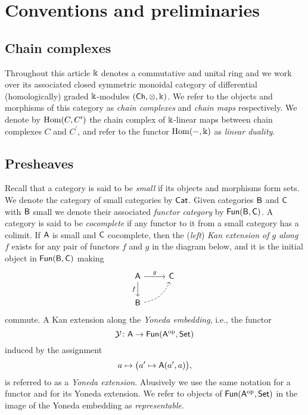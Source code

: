 \section{Conventions and preliminaries} \label{s:preliminaries}

\subsection{Chain complexes}

Throughout this article $\Bbbk$ denotes a commutative and unital ring and we work over its associated closed symmetric monoidal category of differential (homologically) graded $\Bbbk$-modules $(\mathsf{Ch}, \otimes, \Bbbk)$.
We refer to the objects and morphisms of this category as \textit{chain complexes} and \textit{chain maps} respectively.
We denote by $\mathrm{Hom}(C, C^\prime)$ the chain complex of $\Bbbk$-linear maps between chain complexes $C$ and $C^\prime$, and refer to the functor $\mathrm{Hom}(-, \Bbbk)$ as \textit{linear duality}.

\subsection{Presheaves}

Recall that a category is said to be \textit{small} if its objects and morphisms form sets.
We denote the category of small categories by $\mathsf{Cat}$.
Given categories $\mathsf{B}$ and $\mathsf{C}$ with $\mathsf{B}$ small we denote their associated \textit{functor category} by $\mathsf{Fun}(\mathsf{B}, \mathsf{C})$.
A category is said to be \textit{cocomplete} if any functor to it from a small category has a colimit.
If $\mathsf{A}$ is small and $\mathsf{C}$ cocomplete, then the (\textit{left}) \textit{Kan extension of $g$ along $f$} exists for any pair of functors $f$ and $g$ in the diagram below, and it is the initial object in $\mathsf{Fun}(\mathsf{B}, \mathsf{C})$ making
\[
\begin{tikzcd}[column sep=normal, row sep=normal]
\sA \arrow[d, "f"'] \arrow[r, "g"] & \sC \\
\sB \arrow[dashed, ur, bend right] & \quad
\end{tikzcd}
\]
commute.
A Kan extension along the \textit{Yoneda embedding}, i.e., the functor
\[
\operatorname{\mathcal{Y}} \colon \mathsf{A} \to \mathsf{Fun}(\mathsf{A}^{\mathrm{op}}, \mathsf{Set})
\]
induced by the assignment
\[
a \mapsto \big( a^\prime \mapsto \mathsf{A}(a^\prime, a) \big),
\]
is referred to as a \textit{Yoneda extension}.
Abusively we use the same notation for a functor and for its Yoneda extension.
We refer to objects of $\mathsf{Fun}(\mathsf{A}^{\mathrm{op}}, \mathsf{Set})$ in the image of the Yoneda embedding as \textit{representable}.
